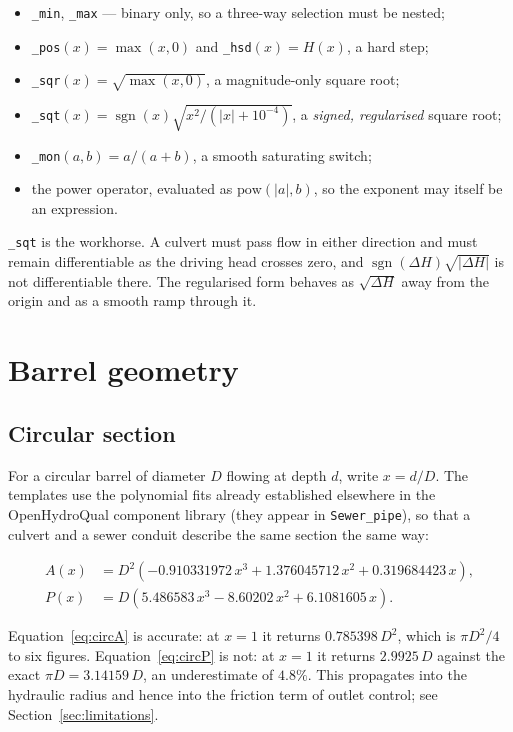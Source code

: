 \documentclass[11pt,a4paper]{article}
\newcommand{\code}[1]{\texttt{\small #1}}
\begin{document}
\begin{itemize}[nosep,leftmargin=1.4em]
  \item \code{\_min}, \code{\_max} --- binary only, so a three-way selection must be nested;
  \item \code{\_pos}$(x)=\max(x,0)$ and \code{\_hsd}$(x)=H(x)$, a hard step;
  \item \code{\_sqr}$(x)=\sqrt{\max(x,0)}$, a magnitude-only square root;
  \item \code{\_sqt}$(x)=\operatorname{sgn}(x)\sqrt{x^{2}/(|x|+10^{-4})}$, a
        \emph{signed, regularised} square root;
  \item \code{\_mon}$(a,b)=a/(a+b)$, a smooth saturating switch;
  \item the power operator, evaluated as $\mathrm{pow}(|a|,b)$, so the exponent
        may itself be an expression.
\end{itemize}

\noindent
\code{\_sqt} is the workhorse. A culvert must pass flow in either direction and
must remain differentiable as the driving head crosses zero, and
$\operatorname{sgn}(\Delta H)\sqrt{|\Delta H|}$ is not differentiable there. The
regularised form behaves as $\sqrt{\Delta H}$ away from the origin and as a
smooth ramp through it.

\section{Barrel geometry}

\subsection{Circular section}

For a circular barrel of diameter $D$ flowing at depth $d$, write $x=d/D$. The
templates use the polynomial fits already established elsewhere in the
OpenHydroQual component library (they appear in \code{Sewer\_pipe}), so that a
culvert and a sewer conduit describe the same section the same way:

\begin{align}
A(x) &= D^{2}\left(-0.910331972\,x^{3}+1.376045712\,x^{2}+0.319684423\,x\right),
\label{eq:circA}\\
P(x) &= D\left(5.486583\,x^{3}-8.60202\,x^{2}+6.1081605\,x\right).
\label{eq:circP}
\end{align}

\noindent
Equation~\eqref{eq:circA} is accurate: at $x=1$ it returns $0.785398\,D^{2}$,
which is $\pi D^{2}/4$ to six figures. Equation~\eqref{eq:circP} is not: at
$x=1$ it returns $2.9925\,D$ against the exact $\pi D=3.14159\,D$, an
underestimate of $4.8\%$. This propagates into the hydraulic radius and hence
into the friction term of outlet control; see
Section~\ref{sec:limitations}.
\end{document}
